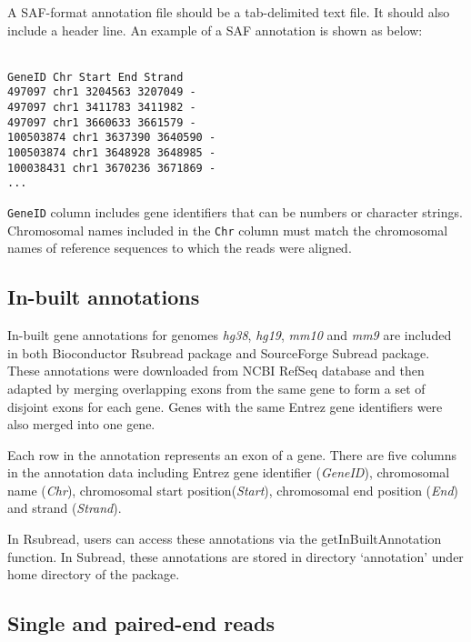 \documentclass[12pt]{report}
\newcommand{\code}[1]{{\small\texttt{#1}}}
\newcommand{\Subread}{\textsf{Subread}}
\newcommand{\Rsubread}{\textsf{Rsubread}}
\begin{document}
A SAF-format annotation file should be a tab-delimited text file.
It should also include a header line.
An example of a SAF annotation is shown as below:

\code{\\
GeneID	Chr	Start	End	Strand\\
497097	chr1	3204563	3207049	-\\
497097	chr1	3411783	3411982	-\\
497097	chr1	3660633	3661579	-\\
100503874	chr1	3637390	3640590	-\\
100503874	chr1	3648928	3648985	-\\
100038431	chr1	3670236	3671869	-\\
...
}

\code{GeneID} column includes gene identifiers that can be numbers or character strings.
Chromosomal names included in the \code{Chr} column must match the chromosomal names of reference sequences to which the reads were aligned.

\subsection{In-built annotations}

In-built gene annotations for genomes \emph{hg38}, \emph{hg19}, \emph{mm10} and \emph{mm9} are included in both Bioconductor {\Rsubread} package and SourceForge {\Subread} package.
These annotations were downloaded from NCBI RefSeq database and then adapted by merging overlapping exons from the same gene to form a set of disjoint exons for each gene.
Genes with the same Entrez gene identifiers were also merged into one gene.

Each row in the annotation represents an exon of a gene. There are five columns in the annotation data including Entrez gene identifier (\emph{GeneID}), chromosomal name (\emph{Chr}), chromosomal start position(\emph{Start}), chromosomal end position (\emph{End}) and strand (\emph{Strand}).

In {\Rsubread}, users can access these annotations via the {\textsf{getInBuiltAnnotation}} function.
In {\Subread}, these annotations are stored in directory `annotation' under home directory of the package.


\subsection{Single and paired-end reads}
\end{document}
